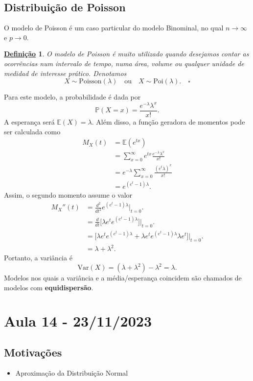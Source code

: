 \documentclass{article}
\newtheorem*{def*}{\underline{Defini\c c\~ao}}
\begin{document}
\subsection{Distribuição de Poisson}
  O modelo de Poisson é um caso particular do modelo Binominal, no qual \(n\longrightarrow \infty\) e \(p\longrightarrow 0\).
\begin{def*}
  O modelo de Poisson é muito utilizado quando desejamos contar as ocorrências num intervalo de tempo, numa área, volume ou qualquer unidade
de medidad de interesse prático. Denotamos 
  \[
    X\sim \mathrm{Poisson}(\lambda )\quad \text{ou}\quad X\sim \mathrm{Poi}(\lambda ).\quad\square
  \]
\end{def*}
  Para este modelo, a probabilidade é dada por 
  \[
    \mathbb{P}(X=x) = \frac{e^{-\lambda }\lambda^{x}}{x!}.
  \]
  A esperança será \(\mathbb{E}(X) = \lambda \). Além disso, a função geradora de momentos pode ser calculada como 
 \begin{align*}
  M_{X}(t) &= \mathbb{E}(e^{tx})\\
           &= \sum\limits_{x=0}^{\infty}e^{tx}\frac{e^{-\lambda }\lambda ^{x}}{x!}\\
           &= e^{-\lambda }\sum\limits_{x=0}^{\infty}\frac{(e^{t}\lambda)^{x}}{x!}\\
           &= e^{(e^{t}-1)\lambda }.
 \end{align*}
 Assim, o segundo momento assume o valor 
\begin{align*}
 M_{X}''(t) &= \frac{d^{2}}{dt^{2}}e^{(e^{t}-1)\lambda }\biggl|_{t=0}^{}\biggr. \\
            &= \frac{d}{dt}\biggl[\lambda e^{t}e^{(e^{t}-1)\lambda }\biggr]\biggl|_{t=0}^{}\biggr.\\
            &= \biggl[\lambda e^{t}e^{(e^{t}-1)\lambda } + \lambda e^{t}e^{(e^{t}-1)\lambda }\lambda e^{t}\biggr]\biggl|_{t=0}^{}\biggr.\\
            &= \lambda + \lambda^{2}.
\end{align*}
  Portanto, a variância é 
  \[
    \mathrm{Var}(X) = (\lambda + \lambda^{2})-\lambda^{2} = \lambda .
  \] 
  Modelos nos quais a variância e a média/esperança coincidem são chamados de modelos com \textbf{equidispersão}.
\newpage

\section{Aula 14 - 23/11/2023}
\subsection{Motivações} 
\begin{itemize}
  \item Aproximação da Distribuição Normal
\end{itemize}
\end{document}
